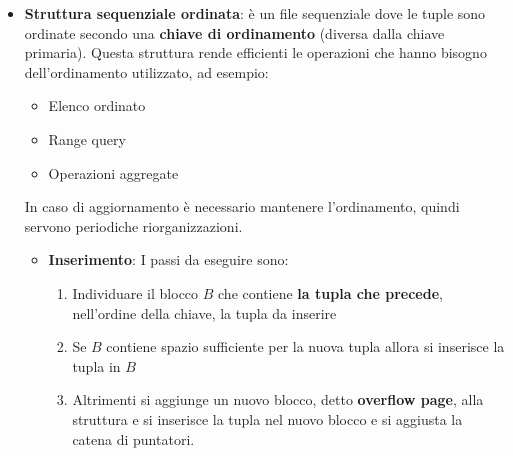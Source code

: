 \documentclass[a4paper,twoside]{article}
\begin{document}
\begin{itemize}
    Ad ogni file viene assegnato un numero \( n \) di blocchi contigui e ciascun
    blocco è dotato di un numero \( m \) di posizioni disponibili per le tuple
    (quindi è un array bidimensionale \( n \times m \)). Ogni tupla è dotata di un
    valore numerico \( i \) che rappresenta l'indice della tupla in \( i \)-esima
    posizione nell'array.

    \begin{itemize}
      \item \textbf{Inserimento}: 
        \begin{itemize}
          \item Iniziale: l'indice \( i \) viene ottenuto incrementando un contatore
          \item Successivo: in una posizione libera oppure alla fine del file
        \end{itemize}

      \item \textbf{Cancellazioni}: creano delle posizioni libere
    \end{itemize}

  \item \textbf{Struttura sequenziale ordinata}: è un file sequenziale dove le tuple
    sono ordinate secondo una \textbf{chiave di ordinamento} (diversa dalla chiave
    primaria). Questa struttura rende efficienti le operazioni che hanno bisogno
    dell'ordinamento utilizzato, ad esempio:
    \begin{itemize}
      \item Elenco ordinato
      \item Range query
      \item Operazioni aggregate
    \end{itemize}
    In caso di aggiornamento è necessario mantenere l'ordinamento, quindi servono
    periodiche riorganizzazioni.

    \begin{itemize}
      \item \label{item:inserimento_ordinato} \textbf{Inserimento}: I passi da eseguire sono:
        \begin{enumerate}
          \item Individuare il blocco \( B \) che contiene \textbf{la tupla che precede},
            nell'ordine della chiave, la tupla da inserire
          \item Se \( B \) contiene spazio sufficiente per la nuova tupla allora si
            inserisce la tupla in \( B \)
          \item Altrimenti si aggiunge un nuovo blocco, detto \textbf{overflow page},
            alla struttura e si inserisce la tupla nel nuovo blocco e si aggiusta la
            catena di puntatori.
        \end{enumerate}


\end{itemize}
\end{itemize}
\end{document}
